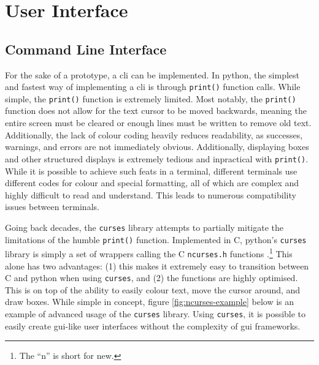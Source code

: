 \documentclass[11pt]{article}
\begin{document}
\newpage

\section{User Interface}

\subsection{Command Line Interface}

For the sake of a prototype, a \acrfull{cli} can be implemented. In \Gls{python}, the simplest and fastest way of implementing a \acrshort{cli} is through \texttt{print()} function calls. While simple, the \texttt{print()} function is extremely limited. Most notably, the \texttt{print()} function does not allow for the text cursor to be moved backwards, meaning the entire screen must be cleared or enough lines must be written to remove old text. Additionally, the lack of colour coding heavily reduces readability, as successes, warnings, and errors are not immediately obvious. Additionally, displaying boxes and other structured displays is extremely tedious and inpractical with \texttt{print()}. While it is possible to achieve such feats in a terminal, different terminals use different codes for colour and special formatting, all of which are complex and highly difficult to read and understand. This leads to numerous compatibility issues between terminals.

Going back decades, the \texttt{curses} \gls{library} attempts to partially mitigate the limitations of the humble \texttt{print()} function. Implemented in C, \Gls{python}'s \texttt{curses} \gls{library} is simply a set of wrappers calling the C \texttt{ncurses.h} functions \cite{curses-python} \cite{ncurses}.\footnote{The ``n'' is short for new.} This alone has two advantages: (1) this makes it extremely easy to transition between C and \Gls{python} when using \texttt{curses}, and (2) the functions are highly optimised. This is on top of the ability to easily colour text, move the cursor around, and draw boxes. While simple in concept, figure \ref{fig:ncurses-example} below is an example of advanced usage of the \texttt{curses} \gls{library}. Using \texttt{curses}, it is possible to easily create \acrshort{gui}-like \gls{user} interfaces without the complexity of \acrshort{gui} \glspl{framework}.
\end{document}
